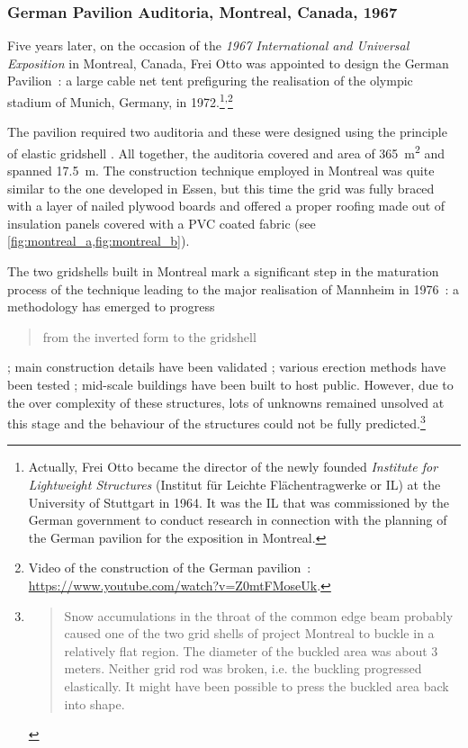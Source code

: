 

\subsubsection{German Pavilion Auditoria, Montreal, Canada, 1967}
Five years later, on the occasion of the \emph{1967 International and Universal Exposition} in Montreal, Canada, Frei Otto was appointed to design the German Pavilion~: a large cable net tent prefiguring the realisation of the olympic stadium of Munich, Germany, in 1972.\footnote{Actually, Frei Otto became the director of the newly founded \emph{Institute for Lightweight Structures} (Institut für Leichte Flächentragwerke or IL) at the University of Stuttgart in 1964. It was the IL that was commissioned by the German government to conduct research in connection with the planning of the German pavilion for the exposition in Montreal.}\textsuperscript{,}\footnote{Video of the construction of the German pavilion~: \url{https://www.youtube.com/watch?v=Z0mtFMoseUk}.}

The pavilion required two auditoria and these were designed using the principle of elastic gridshell \cite[p.~274]{IL10}. All together, the auditoria covered and area of \SI{365}{m^2} and spanned \SI{17.5}{m}. The construction technique employed in Montreal was quite similar to the one developed in Essen, but this time the grid was fully braced with a layer of nailed plywood boards and offered a proper roofing made out of insulation panels covered with a PVC coated fabric (see \cref{fig:montreal_a,fig:montreal_b}).

The two gridshells built in Montreal mark a significant step in the maturation process of the technique leading to the major realisation of Mannheim in 1976~: a methodology has emerged to progress \blockcquote[p.~179]{IL10}{from the inverted form to the gridshell} ; main construction details have been validated ; various erection methods have been tested ; mid-scale buildings have been built to host public. However, due to the over complexity of these structures, lots of unknowns remained unsolved at this stage and the behaviour of the structures could not be fully predicted.\footnote{\blockcquote[p.~219]{IL10}{Snow accumulations in the throat of the common edge beam probably caused one of the two grid shells of project Montreal to buckle in a relatively flat region. The diameter of the buckled area was about 3 meters. Neither grid rod was broken, i.e. the buckling progressed elastically. It might have been possible to press the buckled area back into shape.}}

